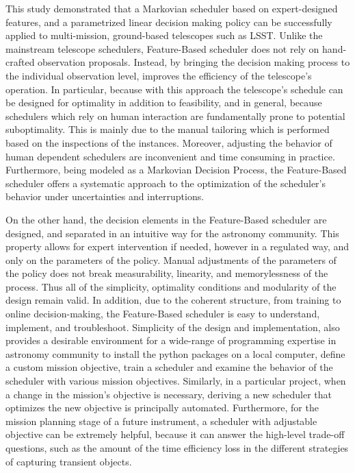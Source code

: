 \documentclass[12pt]{aastex62}
\theoremstyle{definition}
\begin{document}
This study demonstrated that a Markovian scheduler based on expert-designed features, and a parametrized linear decision making policy can be successfully applied to multi-mission, ground-based telescopes such as LSST. Unlike the mainstream telescope schedulers, Feature-Based scheduler does not rely on hand-crafted observation proposals. Instead, by bringing the decision making process to the individual observation level, improves the efficiency of the telescope's operation. In particular, because with this approach the telescope's schedule can be designed for optimality in addition to feasibility, and in general, because schedulers which rely on human interaction are fundamentally prone to potential suboptimality. This is mainly due to the manual tailoring which is performed based on the inspections of the instances. Moreover, adjusting the behavior of human dependent schedulers are inconvenient and time consuming in practice. Furthermore, being modeled as a Markovian Decision Process, the Feature-Based scheduler offers a systematic approach to the optimization of the scheduler's behavior under uncertainties and interruptions.

On the other hand, the decision elements in the Feature-Based scheduler are designed, and separated in an intuitive way for the astronomy community. This property allows for expert intervention if needed, however in a regulated way, and only on the parameters of the policy. Manual adjustments of the parameters of the policy does not break measurability, linearity, and memorylessness of the process. Thus all of the simplicity, optimality conditions and modularity of the design remain valid. In addition, due to the coherent structure, from training to online decision-making, the Feature-Based scheduler is easy to understand, implement, and troubleshoot. Simplicity of the design and implementation, also provides a desirable environment for a wide-range of programming expertise in astronomy community to install the python packages on a local computer, define a custom mission objective, train a scheduler and examine the behavior of the scheduler with various mission objectives. Similarly, in a particular project, when a change in the mission's objective is necessary, deriving a new scheduler that optimizes the new objective is principally automated. Furthermore, for the mission planning stage of a future instrument, a scheduler with adjustable objective can be extremely helpful, because it can answer the high-level trade-off questions, such as the amount of the time efficiency loss in the different strategies of capturing transient objects.
\end{document}
